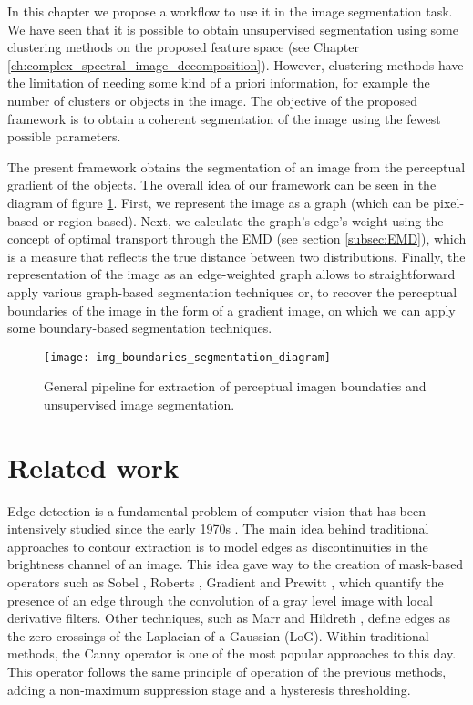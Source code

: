 In this chapter we propose a workflow to use it in the image segmentation task. We have seen that it is possible to obtain unsupervised segmentation using some clustering methods on the proposed feature space (see Chapter \ref{ch:complex_spectral_image_decomposition}). However, clustering methods have the limitation of needing some kind of a priori information, for example the number of clusters or objects in the image. The objective of the proposed framework is to obtain a coherent segmentation of the image using the fewest possible parameters.

The present framework obtains the segmentation of an image from the perceptual gradient of the objects. The overall idea of our framework can be seen in the diagram of figure \ref{fig:pipeline_gabor_image_segmentation}. First, we represent the image as a graph (which can be pixel-based or region-based). Next, we calculate the graph's edge's weight using the concept of optimal transport through the EMD (see section \ref{subsec:EMD}), which is a measure that reflects the true distance between two distributions. Finally, the representation of the image as an edge-weighted graph allows to straightforward apply various graph-based segmentation techniques or, to recover the perceptual boundaries of the image in the form of a gradient image, on which we can apply some boundary-based segmentation techniques.


\begin{figure}[!ht]
	\centering
	\texttt{[image: img\_boundaries\_segmentation\_diagram]}
	\caption{General pipeline for extraction of perceptual imagen boundaties and unsupervised image segmentation.}\label{fig:pipeline_gabor_image_segmentation}
\end{figure}

\section{Related work}\label{sec:soa_boundaries_segmentation}
Edge detection is a fundamental problem of computer vision that has been intensively studied since the early 1970s \citep{Hueckel:JACM:1971, Fram.Deutsch:TC:1975}. The main idea behind traditional approaches to contour extraction is to model edges as discontinuities in the brightness channel of an image. This idea gave way to the creation of mask-based operators such as Sobel \citep{Maitre:Book:2003}, Roberts \citep{Roberts:Thesis:1963}, Gradient \citep{Maitre:Book:2003} and Prewitt \citep{Prewitt:PPP:1970}, which quantify the presence of an edge through the convolution of a gray level image with local derivative filters. Other techniques, such as Marr and Hildreth \citep{Marr.Hildreth:PRS:1980}, define edges as the zero crossings of the Laplacian of a Gaussian (LoG). Within traditional methods, the Canny \citep{Canny:PAMI:1986} operator is one of the most popular approaches to this day. This operator follows the same principle of operation of the previous methods, adding a non-maximum suppression stage and a hysteresis thresholding.

